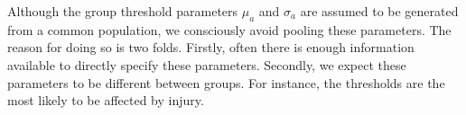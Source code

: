 \documentclass[a4paper,12pt]{article}
\begin{document}
Although the group threshold parameters $\mu_a$ and $\sigma_a$ are assumed to be generated from a common population, we consciously avoid pooling these parameters. The reason for doing so is two folds. Firstly, often there is enough information available to directly specify these parameters. Secondly, we expect these parameters to be different between groups. For instance, the thresholds are the most likely to be affected by injury.
\end{document}

